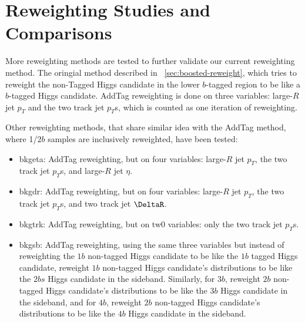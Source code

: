 \section{Reweighting Studies and Comparisons}
\label{app:reweightstudy}

More reweighting methods are tested to further validate our current reweighting method. The oringial method described in ~\ref{sec:boosted-reweight}, which tries to reweight the non-Tagged Higgs candidate in the lower $b$-tagged region to be like a $b$-tagged Higgs candidate. AddTag reweighting is done on three variables: large-$R$ jet $p_{T}$ and the two track jet $p_{T}$s, which is counted as one iteration of reweighting.

Other reweighting methods, that share similar idea with the AddTag method, where 1/$2b$ samples are inclusively reweighted, have been tested:
\begin{itemize}
	\item bkgeta: AddTag reweighting, but on four variables: large-$R$ jet $p_{T}$, the two track jet $p_{T}$s, and large-$R$ jet $\eta$.
	\item bkgdr: AddTag reweighting, but on four variables: large-$R$ jet $p_{T}$, the two track jet $p_{T}$s, and two track jet $\DeltaR$.
	\item bkgtrk: AddTag reweighting, but on tw0 variables: only the two track jet $p_{T}$s.
	\item bkgsb: AddTag reweighting, using the same three variables but instead of reweighting the $1b$ non-tagged Higgs candidate to be like the $1b$ tagged Higgs candidate, reweight $1b$ non-tagged Higgs candidate's distributions to be like the $2bs$ Higgs candidate in the sideband. Similarly, for $3b$, reweight $2b$ non-tagged Higgs candidate's distributions to be like the $3b$ Higgs candidate in the sideband, and for $4b$, reweight $2b$ non-tagged Higgs candidate's distributions to be like the $4b$ Higgs candidate in the sideband.
\end{itemize}

